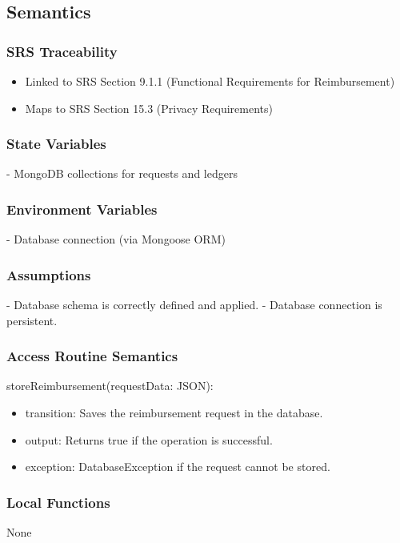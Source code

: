 \documentclass[12pt, titlepage]{article}
\begin{document}
\subsection{Semantics}

\subsubsection{SRS Traceability}
\begin{itemize}
  \item Linked to SRS Section 9.1.1 (Functional Requirements for Reimbursement)
  \item Maps to SRS Section 15.3 (Privacy Requirements)
\end{itemize}

\subsubsection{State Variables}
- MongoDB collections for requests and ledgers

\subsubsection{Environment Variables}
- Database connection (via Mongoose ORM)

\subsubsection{Assumptions}
- Database schema is correctly defined and applied.
- Database connection is persistent.

\subsubsection{Access Routine Semantics}
\noindent storeReimbursement(requestData: JSON):
\begin{itemize}
\item transition: Saves the reimbursement request in the database.
\item output: Returns true if the operation is successful.
\item exception: DatabaseException if the request cannot be stored.
\end{itemize}

\subsubsection{Local Functions}
None
\end{document}
